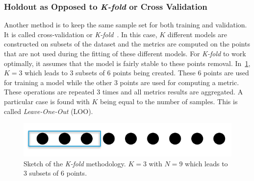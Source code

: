 
\subsubsection{Holdout as Opposed to \emph{K-fold} or Cross Validation}
Another method is to keep the same sample set for both training and validation. It is called cross-validation or \emph{K-fold}~\cite{kohavi1995}. In this case, $K$ different models are constructed on subsets of the dataset and the metrics are computed on the points that are not used during the fitting of these different models. For \emph{K-fold} to work optimally, it assumes that the model is fairly stable to these points removal. In~\cref{fig:k_fold}, $K=3$ which leads to 3 subsets of 6 points being created. These 6 points are used for training a model while the other 3 points are used for computing a metric. These operations are repeated 3 times and all metrics results are aggregated. A particular case is found with $K$ being equal to the number of samples. This is called \emph{Leave-One-Out} (LOO).

\begin{figure}[!ht]
\centering
\includegraphics[width=0.6\linewidth,keepaspectratio]{fig/literature/k_fold.png}
\caption{Sketch of the \emph{K-fold} methodology. $K=3$ with $N=9$ which leads to 3 subsets of 6 points.}
\label{fig:k_fold}
\end{figure}


